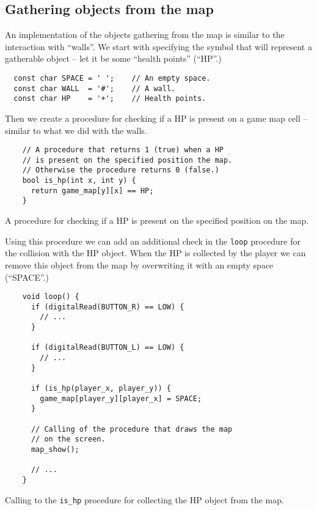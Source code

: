 \documentclass[../sparc.tex]{subfiles}
\begin{document}
\subsection{Gathering objects from the map}

An implementation of the objects gathering from the map is similar to the
interaction with ``walls''.  We start with specifying the symbol that will
represent a gatherable object -- let it be some ``health points'' (``HP''.)

\begin{verbatim}
  const char SPACE = ' ';    // An empty space.
  const char WALL  = '#';    // A wall.
  const char HP    = '+';    // Health points.
\end{verbatim}

Then we create a procedure for checking if a HP is present on a game map cell --
similar to what we did with the walls.

\begin{listing}[H]
  \begin{verbatim}
    // A procedure that returns 1 (true) when a HP
    // is present on the specified position the map.
    // Otherwise the procedure returns 0 (false.)
    bool is_hp(int x, int y) {
      return game_map[y][x] == HP;
    }
  \end{verbatim}
  \caption{A procedure for checking if a HP is present on the specified position
    on the map.}
  \label{listing:game-dev-is-hp-procedure}
\end{listing}

Using this procedure we can add an additional check in the
\texttt{loop} procedure for the collision with the HP object.  When the
HP is collected by the player we can remove this object from the map by
overwriting it with an empty space (``SPACE''.)

\begin{listing}[H]
  \begin{verbatim}
    void loop() {
      if (digitalRead(BUTTON_R) == LOW) {
        // ...
      }

      if (digitalRead(BUTTON_L) == LOW) {
        // ...
      }

      if (is_hp(player_x, player_y)) {
        game_map[player_y][player_x] = SPACE;
      }

      // Calling of the procedure that draws the map
      // on the screen.
      map_show();

      // ...
    }
  \end{verbatim}
  \caption{Calling to the \texttt{is_hp} procedure for collecting the
    HP object from the map.}
  \label{listing:game-dev-is-hp-procedure-call}
\end{listing}
\end{document}
